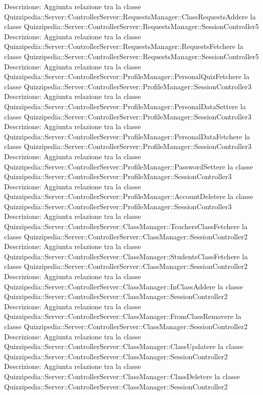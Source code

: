 Descrizione: Aggiunta relazione tra la classe Quizzipedia::Server::ControllerServer::RequestsManager::ClassRequestsAddere la classe Quizzipedia::Server::ControllerServer::RequestsManager::SessionController5 
Descrizione: Aggiunta relazione tra la classe Quizzipedia::Server::ControllerServer::RequestsManager::RequestsFetchere la classe Quizzipedia::Server::ControllerServer::RequestsManager::SessionController5 
Descrizione: Aggiunta relazione tra la classe Quizzipedia::Server::ControllerServer::ProfileManager::PersonalQuizFetchere la classe Quizzipedia::Server::ControllerServer::ProfileManager::SessionController3 
Descrizione: Aggiunta relazione tra la classe Quizzipedia::Server::ControllerServer::ProfileManager::PersonalDataSettere la classe Quizzipedia::Server::ControllerServer::ProfileManager::SessionController3 
Descrizione: Aggiunta relazione tra la classe Quizzipedia::Server::ControllerServer::ProfileManager::PersonalDataFetchere la classe Quizzipedia::Server::ControllerServer::ProfileManager::SessionController3 
Descrizione: Aggiunta relazione tra la classe Quizzipedia::Server::ControllerServer::ProfileManager::PasswordSettere la classe Quizzipedia::Server::ControllerServer::ProfileManager::SessionController3 
Descrizione: Aggiunta relazione tra la classe Quizzipedia::Server::ControllerServer::ProfileManager::AccountDeletere la classe Quizzipedia::Server::ControllerServer::ProfileManager::SessionController3 
Descrizione: Aggiunta relazione tra la classe Quizzipedia::Server::ControllerServer::ClassManager::TeachersClassFetchere la classe Quizzipedia::Server::ControllerServer::ClassManager::SessionController2 
Descrizione: Aggiunta relazione tra la classe Quizzipedia::Server::ControllerServer::ClassManager::StudentsClassFetchere la classe Quizzipedia::Server::ControllerServer::ClassManager::SessionController2 
Descrizione: Aggiunta relazione tra la classe Quizzipedia::Server::ControllerServer::ClassManager::InClassAddere la classe Quizzipedia::Server::ControllerServer::ClassManager::SessionController2 
Descrizione: Aggiunta relazione tra la classe Quizzipedia::Server::ControllerServer::ClassManager::FromClassRemovere la classe Quizzipedia::Server::ControllerServer::ClassManager::SessionController2 
Descrizione: Aggiunta relazione tra la classe Quizzipedia::Server::ControllerServer::ClassManager::ClassUpdatere la classe Quizzipedia::Server::ControllerServer::ClassManager::SessionController2 
Descrizione: Aggiunta relazione tra la classe Quizzipedia::Server::ControllerServer::ClassManager::ClassDeletere la classe Quizzipedia::Server::ControllerServer::ClassManager::SessionController2 
